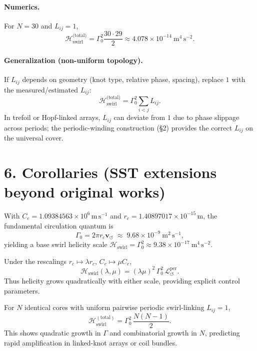 \documentclass[11pt]{article}
\begin{document}
\paragraph{Numerics.}
    For $N=30$ and $L_{ij}=1$,
    \[
        \mathcal{H}_{\text{swirl}}^{\text{(total)}}
        = \Gamma_0^2 \frac{30\cdot29}{2}
        \approx 4.078 \times 10^{-14}\ \mathrm{m^4\,s^{-2}}.
    \]

\paragraph{Generalization (non-uniform topology).}
    If $L_{ij}$ depends on geometry (knot type, relative phase, spacing), replace $1$ with the measured/estimated $L_{ij}$:
    \[
        \mathcal{H}_{\text{swirl}}^{\text{(total)}}
        = \Gamma_0^2 \sum_{i<j} L_{ij}.
    \]
    In trefoil or Hopf-linked arrays, $L_{ij}$ can deviate from $1$ due to phase slippage across periods; the periodic-winding construction (§2) provides the correct $L_{ij}$ on the universal cover.


\section*{6. Corollaries (SST extensions beyond original works)}

\begin{corollary}
With $C_e=1.09384563\times 10^6\,\mathrm{m\,s^{-1}}$ and $r_c=1.40897017\times 10^{-15}\,\mathrm{m}$,
the fundamental circulation quantum is
\[
    \Gamma_0 = 2\pi r_c \mathbf{v}_{\scriptscriptstyle\boldsymbol{\circlearrowleft}} \;\approx\; 9.68\times10^{-9}\ \mathrm{m^2\,s^{-1}},
\]
yielding a base swirl helicity scale
\(\mathcal{H}_{\text{swirl}} = \Gamma_0^2 \approx 9.38\times10^{-17}\ \mathrm{m^4\,s^{-2}}\).
\end{corollary}

\begin{corollary}
Under the rescalings $r_c\mapsto \lambda r_c$, $C_e\mapsto \mu C_e$,
\[
    \mathcal{H}_{\text{swirl}}(\lambda,\mu) = (\lambda\mu)^2\,\Gamma_0^2\,
    \mathcal{L}_{\circlearrowleft}^{\mathrm{per}}.
\]
Thus helicity grows quadratically with either scale, providing explicit control parameters.
\end{corollary}

\begin{corollary}
For $N$ identical cores with uniform pairwise periodic swirl-linking $L_{ij}=1$,
\[
    \mathcal{H}_{\text{swirl}}^{\mathrm{(total)}}
    = \Gamma_0^2\,\frac{N(N-1)}{2}.
\]
This shows quadratic growth in $\Gamma$ and combinatorial growth in $N$, predicting rapid amplification in linked-knot arrays or coil bundles.
\end{corollary}
\end{document}

